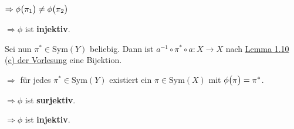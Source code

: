 \documentclass{scrreprt}
\newcommand\Sym{\text{Sym}}
\begin{document}
\begin{enumerate}[(a)]
  $\Rightarrow \phi\qty\big(\pi_1) \ne \phi\qty\big(\pi_2)$

  $\Rightarrow \phi$ ist \textbf{injektiv}.

  Sei nun $\pi^* \in \Sym(Y)$ beliebig.
  Dann ist $a^{-1} \circ \pi^* \circ a \colon X \to X$ nach
  \hyperref[lemma:1.10c]{Lemma 1.10 (c) der Vorlesung} eine Bijektion.
  $\Rightarrow$ für jedes $\pi^* \in \Sym(Y)$ existiert ein $\pi \in \Sym(X)$
  mit $\phi\qty\big(\pi) = \pi^*$.

  $\Rightarrow \phi$ ist \textbf{surjektiv}.

  $\Rightarrow \phi$ ist \textbf{injektiv}.
\end{enumerate}
\end{document}
